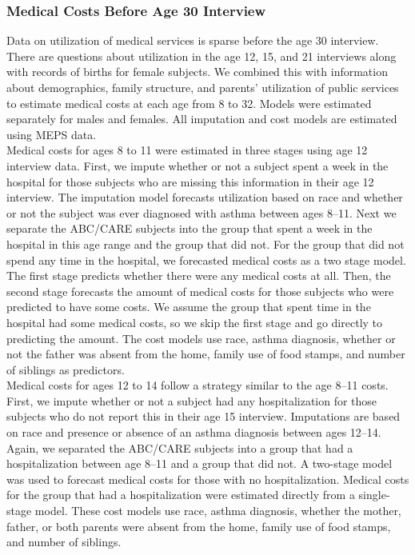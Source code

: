 \subsubsection{Medical Costs Before Age 30 Interview}

\noindent Data on utilization of medical services is sparse before the age 30 interview. There are questions about utilization in the age 12, 15, and 21 interviews along with records of births for female subjects. We combined this with information about demographics, family structure, and parents' utilization of public services to estimate medical costs at each age from 8 to 32. Models were estimated separately for males and females. All imputation and cost models are estimated using MEPS data. \\

\noindent Medical costs for ages 8 to 11 were estimated in three stages using age 12 interview data. First, we impute whether or not a subject spent a week in the hospital for those subjects who are missing this information in their age 12 interview. The imputation model forecasts utilization based on race and whether or not the subject was ever diagnosed with asthma between ages 8--11. Next we separate the ABC/CARE subjects into the group that spent a week in the hospital in this age range and the group that did not. For the group that did not spend any time in the hospital, we forecasted medical costs as a two stage model. The first stage predicts whether there were any medical costs at all. Then, the second stage forecasts the amount of medical costs for those subjects who were predicted to have some costs. We assume the group that spent time in the hospital had some medical costs, so we skip the first stage and go directly to predicting the amount. The cost models use race, asthma diagnosis, whether or not the father was absent from the home, family use of food stamps, and number of siblings as predictors.\\

\noindent Medical costs for ages 12 to 14 follow a strategy similar to the age 8--11 costs. First, we impute whether or not a subject had any hospitalization for those subjects who do not report this in their age 15 interview. Imputations are based on race and presence or absence of an asthma diagnosis between ages 12--14. Again, we separated the ABC/CARE subjects into a group that had a hospitalization between age 8--11 and a group that did not. A two-stage model was used to forecast medical costs for those with no hospitalization. Medical costs for the group that had a hospitalization were estimated directly from a single-stage model. These cost models use race, asthma diagnosis, whether the mother, father, or both parents were absent from the home, family use of food stamps, and number of siblings.\\

